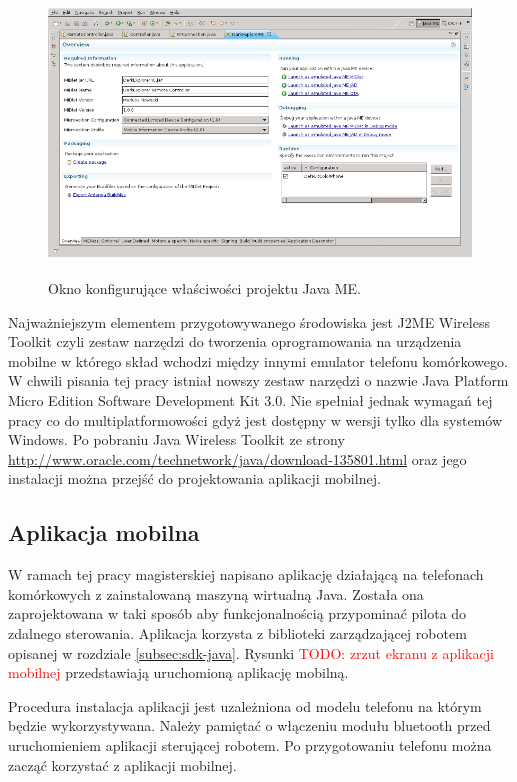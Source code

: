 \begin{figure}[!ht]
 \centering \includegraphics[height=75mm]{../images/ch05/mobile_tools_4_j.png}
 \caption{Okno konfigurujące właściwości projektu Java ME.}
 \label{fig:MobTools4J}
\end{figure}

Najważniejszym elementem przygotowywanego środowiska jest J2ME Wireless Toolkit
czyli zestaw narzędzi do tworzenia oprogramowania na urządzenia mobilne w którego
skład wchodzi między innymi emulator telefonu komórkowego. W chwili pisania tej
pracy istniał nowszy zestaw narzędzi o nazwie Java Platform Micro Edition
Software Development Kit 3.0. Nie spełniał jednak wymagań tej pracy co do
multiplatformowości gdyż jest dostępny w wersji tylko dla systemów Windows. Po
pobraniu Java Wireless Toolkit ze strony
\url{http://www.oracle.com/technetwork/java/download-135801.html} oraz jego
instalacji można przejść do projektowania aplikacji mobilnej.

\subsection{Aplikacja mobilna}
W ramach tej pracy magisterskiej napisano aplikację działającą na telefonach
komórkowych z zainstalowaną maszyną wirtualną Java. Została ona zaprojektowana w
taki sposób aby funkcjonalnością przypominać pilota do zdalnego sterowania.
Aplikacja korzysta z biblioteki zarządzającej robotem opisanej w rozdziale
\ref{subsec:sdk-java}. Rysunki \textcolor{red}{TODO: zrzut ekranu z aplikacji
mobilnej} przedstawiają uruchomioną aplikację mobilną.

Procedura instalacja aplikacji jest uzależniona od modelu telefonu na którym
będzie wykorzystywana. Należy pamiętać o włączeniu modułu bluetooth przed
uruchomieniem aplikacji sterującej robotem. Po przygotowaniu telefonu można
zacząć korzystać z aplikacji mobilnej.